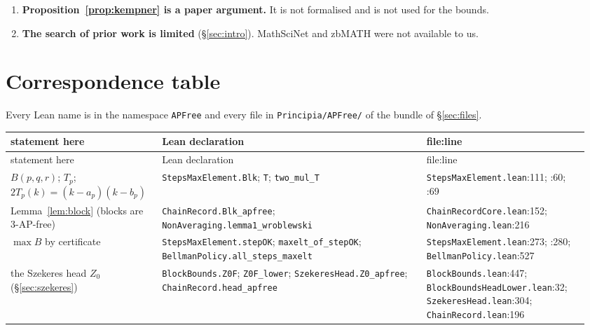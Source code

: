 \documentclass[11pt,a4paper]{article}
\theoremstyle{definition}
\theoremstyle{remark}
\newcommand{\Blk}{B}
\newcommand{\code}[1]{\texttt{#1}}
\begin{document}
\begin{enumerate}
\item \textbf{Proposition~\ref{prop:kempner} is a paper argument.} It is not formalised and is not used for the bounds.
\item \textbf{The search of prior work is limited} (\S\ref{sec:intro}). MathSciNet and zbMATH were not available to us.
\end{enumerate}

\section{Correspondence table}\label{sec:corr}

Every Lean name is in the namespace \code{APFree} and every file in \code{Principia/APFree/} of the bundle of \S\ref{sec:files}.

\begin{small}
\begin{longtable}{@{}>{\raggedright\arraybackslash}p{0.25\linewidth}>{\raggedright\arraybackslash}p{0.44\linewidth}>{\raggedright\arraybackslash}p{0.27\linewidth}@{}}
\toprule
\textbf{statement here} & \textbf{Lean declaration} & \textbf{file:line} \\
\midrule\endfirsthead
\toprule
statement here & Lean declaration & file:line \\
\midrule\endhead
$\Blk(p,q,r)$; $T_p$; $2T_p(k)=(k-a_p)(k-b_p)$ & \code{StepsMaxElement.\allowbreak{}Blk}; \code{T}; \code{two\_\allowbreak{}mul\_\allowbreak{}T} & \code{StepsMaxElement.\allowbreak{}lean}:111; :60; :69 \\
Lemma~\ref{lem:block} (blocks are 3-AP-free) & \code{ChainRecord.\allowbreak{}Blk\_\allowbreak{}apfree}; \code{NonAveraging.\allowbreak{}lemma1\_\allowbreak{}wroblewski} & \code{ChainRecordCore.\allowbreak{}lean}:152; \code{NonAveraging.\allowbreak{}lean}:216 \\
$\max \Blk$ by certificate & \code{StepsMaxElement.\allowbreak{}stepOK}; \code{maxelt\_\allowbreak{}of\_\allowbreak{}stepOK}; \code{BellmanPolicy.\allowbreak{}all\_\allowbreak{}steps\_\allowbreak{}maxelt} & \code{StepsMaxElement.\allowbreak{}lean}:273; :280; \code{BellmanPolicy.\allowbreak{}lean}:527 \\
the Szekeres head $Z_0$ (\S\ref{sec:szekeres}) & \code{BlockBounds.\allowbreak{}Z0F}; \code{Z0F\_\allowbreak{}lower}; \code{SzekeresHead.\allowbreak{}Z0\_\allowbreak{}apfree}; \code{ChainRecord.\allowbreak{}head\_\allowbreak{}apfree} & \code{BlockBounds.\allowbreak{}lean}:447; \code{BlockBoundsHeadLower.\allowbreak{}lean}:32; \code{SzekeresHead.\allowbreak{}lean}:304; \code{ChainRecord.\allowbreak{}lean}:196 \\

\end{longtable}
\end{small}
\end{document}
